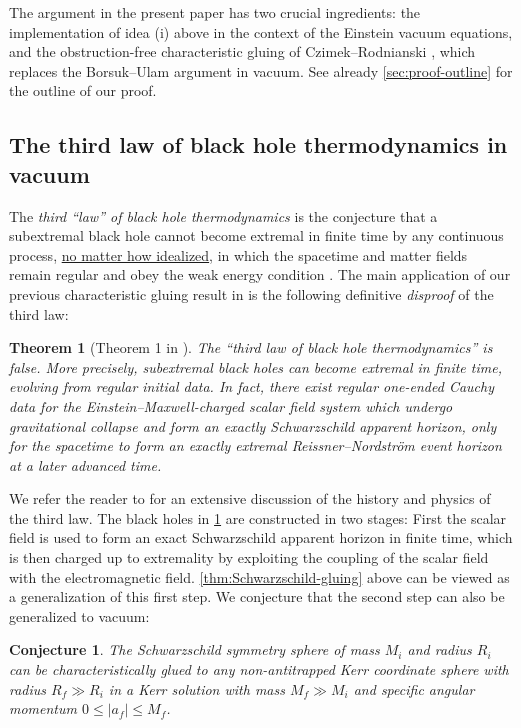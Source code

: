 \documentclass[10pt]{article}
\numberwithin{equation}{section}
\theoremstyle{plain}
\newtheorem{thm}{Theorem}%
\newtheorem{conj}{Conjecture}
\theoremstyle{definition}
\begin{document}
The argument in the present paper has two crucial ingredients: the implementation of  idea (i) above in the context of the Einstein vacuum equations, and the obstruction-free characteristic gluing of Czimek--Rodnianski \cite{Czimek2022-cl}, which replaces the Borsuk--Ulam argument in vacuum. See already \cref{sec:proof-outline} for the outline of our proof.

\subsection{The third law of black hole thermodynamics in vacuum}\label{sec:third-law}

The \emph{third ``law'' of black hole thermodynamics} is the conjecture that a subextremal black hole cannot become extremal in finite time by any continuous process, \underline{no matter how idealized}, in  which the spacetime and matter fields remain regular and obey the weak energy condition \cite{BCH, Israel-third-law}. The main application of our previous characteristic gluing result in \cite{KU22} is the following definitive \emph{disproof} of the third law: 

\begin{thm}[Theorem 1 in \cite{KU22}]\label{thm:third-law}
The ``third law of black hole thermodynamics'' is false. More precisely, subextremal black holes can become extremal in finite time, evolving from regular initial data. In fact, there exist regular one-ended Cauchy data for the Einstein--Maxwell-charged scalar field system 
which undergo gravitational collapse and form an exactly Schwarzschild apparent horizon, only for the spacetime to form an exactly extremal Reissner--Nordstr\"om event horizon at a later advanced time. 
\end{thm}

We refer the reader to \cite{KU22} for an extensive discussion of the history and physics of the third law. The black holes in \cref{thm:third-law} are constructed in two stages: First the scalar field is used to form an exact Schwarzschild apparent horizon in finite time, which is then charged up to extremality by exploiting the coupling of the scalar field with the electromagnetic field. \cref{thm:Schwarzschild-gluing} above can be viewed as a generalization of this first step. We conjecture that the second step can also be generalized to vacuum: 

\begin{conj}
The Schwarzschild symmetry sphere of mass $M_i$ and radius $R_i$ can be characteristically glued to any non-antitrapped Kerr coordinate sphere with radius $R_f\gg R_i$ in a Kerr solution with mass $M_f\gg M_i$ and specific angular momentum $0\le |a_f|\le M_f$.
\end{conj}
\end{document}
